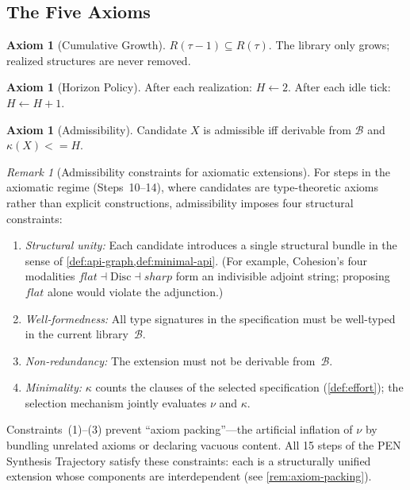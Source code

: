 \documentclass[11pt,a4paper]{article}
\def\leq{<=}%
\def\flat{flat}%
\def\sharp{sharp}%
\theoremstyle{plain}
\theoremstyle{definition}
\newtheorem{axiom}[theorem]{Axiom}
\theoremstyle{remark}
\newtheorem{remark}[theorem]{Remark}
\newcommand{\Disc}{\mathrm{Disc}}
\begin{document}
\subsection{The Five Axioms}

\begin{axiom}[Cumulative Growth]
\label{ax:cumulative}
$R(\tau - 1) \subseteq R(\tau)$.
The library only grows; realized structures are never removed.
\end{axiom}

\begin{axiom}[Horizon Policy]
\label{ax:horizon}
After each realization: $H \leftarrow 2$.
After each idle tick: $H \leftarrow H + 1$.
\end{axiom}

\begin{axiom}[Admissibility]
\label{ax:admissibility}
Candidate $X$ is admissible iff derivable from $\mathcal{B}$ and $\kappa(X) \leq H$.
\end{axiom}

\begin{remark}[Admissibility constraints for axiomatic extensions]
\label{rem:admissibility-constraints}
For steps in the axiomatic regime (Steps~10--14), where candidates are type-theoretic axioms rather than explicit constructions, admissibility imposes four structural constraints:
\begin{enumerate}[nosep]
    \item \emph{Structural unity:} Each candidate introduces a single structural bundle in the sense of \cref{def:api-graph,def:minimal-api}.  (For example, Cohesion's four modalities $\flat \dashv \Disc \dashv \sharp$ form an indivisible adjoint string; proposing $\flat$ alone would violate the adjunction.)
    \item \emph{Well-formedness:} All type signatures in the specification must be well-typed in the current library~$\mathcal{B}$.
    \item \emph{Non-redundancy:} The extension must not be derivable from~$\mathcal{B}$.
    \item \emph{Minimality:} $\kappa$ counts the clauses of the selected specification (\cref{def:effort}); the selection mechanism jointly evaluates $\nu$ and $\kappa$.
\end{enumerate}
Constraints~(1)--(3) prevent ``axiom packing''---the artificial inflation of $\nu$ by bundling unrelated axioms or declaring vacuous content.  All 15 steps of the PEN Synthesis Trajectory satisfy these constraints: each is a structurally unified extension whose components are interdependent (see \cref{rem:axiom-packing}).
\end{remark}
\end{document}
